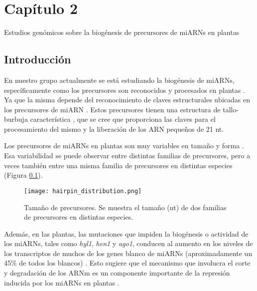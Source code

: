 
\graphicspath{{Chapter2/Figs/}}

\setcounter{chapter}{5}
\chapter*{Capítulo 2} 
\setcounter{figure}{0}
\setcounter{section}{0}

{\LARGE Estudios genómicos sobre la biogénesis de precursores de miARNs en plantas}

\section{Introducción}
En nuestro grupo actualmente se está estudiando la biogénesis de miARNs, específicamente como los precursores son reconocidos y procesados en plantas \citep{Bologna2013}.
Ya que la misma depende del reconocimiento de claves estructurales ubicadas en los precursores de miARN \citep{pmid21554756,citeulike:8816489,Bologna11112012}.
Estos precursores tienen una estructura de tallo-burbuja característica \citep{Jones-Rhoades2006}, que se cree que proporciona las claves para el procesamiento del mismo y la liberación de los ARN pequeños de 21 nt.

Los precursores de miARNs en plantas son muy variables en tamaño y forma \citep{Bologna2013,citeulike:8816489}.
Esa variabilidad se puede observar entre distintas familias de precursores, pero a veces también entre una misma familia de precursores en distintas especies (Figura \ref{fig:hairpin_distribution}).

\begin{figure}[htbp!] 
    \centering    
    \texttt{[image: hairpin\_distribution.png]}
    \caption[Tamaño de precursores]{Tamaño de precursores. Se muestra el tamaño (nt) de dos familias de precursores en distintas especies.}
    \label{fig:hairpin_distribution}
\end{figure}

Además, en las plantas, las mutaciones que impiden la biogénesis o actividad de los miARNs, tales como \textit{hyl1}, \textit{hen1} y \textit{ago1}, conducen al aumento en los niveles de los transcriptos de muchos de los genes blanco de miARNs (aproximadamente un 45\% de todos los blancos) \citep{Han2004,pmid12747833,pmid16889646,Allen2005207}.
Esto sugiere que el mecanismo que involucra el corte y degradación de los ARNm es un componente importante de la represión inducida por los miARNs en plantas \citep{Jones-Rhoades2006, Voinnet2009669}.

